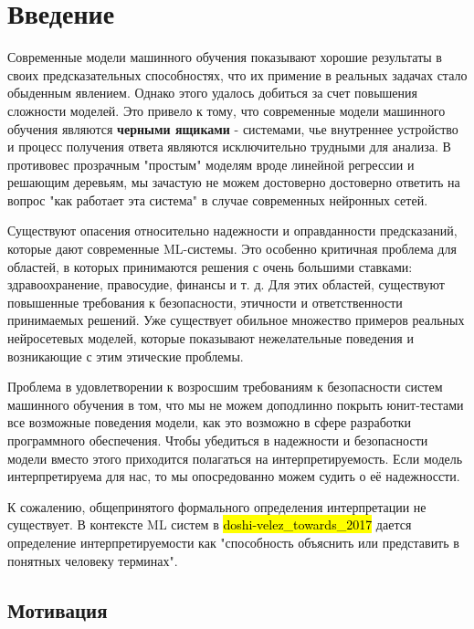 \chapter{Введение}

Современные модели машинного обучения показывают хорошие результаты в своих предсказательных способностях, что их примение в реальных задачах стало обыденным явлением. Однако этого удалось добиться за счет повышения сложности моделей. Это привело к тому, что современные модели машинного обучения являются \textbf{черными ящиками} - системами, чье внутреннее устройство и процесс получения ответа являются исключительно трудными для анализа. В противовес прозрачным "простым" моделям вроде линейной регрессии и решающим деревьям, мы зачастую не можем достоверно достоверно ответить на вопрос "как работает эта система" в случае современных нейронных сетей.

Существуют опасения относительно надежности и оправданности предсказаний, которые дают современные ML-системы. Это особенно критичная проблема для областей, в которых принимаются решения с очень большими ставками: здравоохранение, правосудие, финансы и т. д.  Для этих областей, существуют повышенные требования к безопасности, этичности и ответственности принимаемых решений. Уже существует обильное множество примеров реальных нейросетевых моделей, которые показывают нежелательные поведения и возникающие с этим этические проблемы. 

Проблема в удовлетворении к возросшим требованиям к безопасности систем машинного обучения в том, что мы не можем  доподлинно покрыть юнит-тестами все возможные поведения модели, как это возможно в сфере разработки программного обеспечения. Чтобы убедиться в надежности и безопасности модели вместо этого приходится полагаться на интерпретируемость. Если модель интерпретируема для нас, то мы опосредованно можем судить о её надежноссти.

К сожалению, общепринятого формального определения интерпретации не существует. В контексте ML систем в \hl{doshi-velez_towards_2017} дается определение интерпретируемости как "способность объяснить или представить в понятных человеку терминах".


\section{Мотивация}

